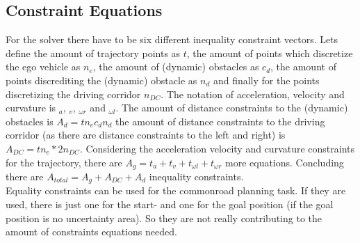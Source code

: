 \documentclass[conference]{IEEEtran}
\begin{document}
\subsection{Constraint Equations}
For the solver there have to be six different inequality constraint vectors.
Lets define the amount of trajectory points as $t$, the amount of points which discretize the ego vehicle as $n_e$, the amount of (dynamic) obstacles as $c_d$, the amount of points discrediting the (dynamic) obstacle as $n_d$ and finally for the points discretizing the driving corridor $n_{DC}$. The notation of acceleration, velocity and curvature is $_a $, $ _v$, $_{\omega r}$ and $_{\omega l}$. The amount of distance constraints to the (dynamic) obstacles is $A_d = t n_e c_d n_d $  the amount of distance constraints to the driving corridor (as there are distance constraints to the left and right) is $A_{DC} = t n_e * 2 n_{DC}$.
Considering the acceleration velocity and curvature constraints for the trajectory, there are $A_g = t_a+t_v+t_{\omega l} +t_{\omega r}$ more equations.
Concluding there are $A_{total} = A_g+ A_{DC}+ A_d$ inequality constraints.\\
Equality constraints can be used for the commonroad planning task. If they are used, there is just one for the start- and one for the goal position (if the goal position is no uncertainty area). So they are not really contributing to the amount of constraints equations needed.
\end{document}
